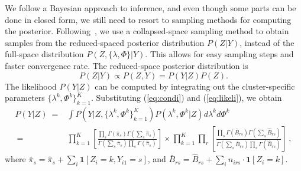 We follow a Bayesian approach to inference, and even though some parts can be done in closed form, we still need to resort to sampling methods for computing the posterior.  Following~\cite{moises}, we use a collapsed-space sampling method \cite{neal2000markov,collapsed_escobar} to obtain samples from the reduced-spaced posterior distribution $P(Z|Y)$, instead of the full-space distribution $P(Z, \{\lambda, \Phi\} | Y)$. This allows for easy sampling steps and faster convergence rate. 
The reduced-space posterior distribution is
\begin{equation*}
 P(Z|Y) \propto P(Z, Y) = P(Y|Z) P(Z).
\end{equation*}
The likelihood $P(Y|Z)$ can be computed by integrating out the cluster-specific parameters $\{\lambda^k, \Phi^k\}_{k=1}^K$.
Substituting  (\ref{eq:condi}) and (\ref{eq:likeli}), we obtain
\begin{equation*}
\renewcommand*{\arraystretch}{1.9}
\begin{array}{rl}
     P(Y|Z) 
~ = & \int  P(Y| Z, \{\lambda^k, \Phi^k \}_{k=1}^K) P(\lambda^k, \Phi^k | Z) d\lambda^k d\Phi^{k} \\
~ = & \displaystyle{ \prod_{k=1}^K 
      \left[ 
      \frac{\prod_s \Gamma(\bar \pi_s) \Gamma (\sum_s \hat \pi_s)}
           {\Gamma\left( \sum_s \bar \pi_s \right) \prod_s \Gamma (\hat \pi_s)}
      \right]  } \times
    \displaystyle{ \prod_{k=1}^K \prod_r 
      \left[ 
      \frac{\prod_s \Gamma(\bar B_{rs}) \Gamma (\sum_s \hat B_{rs})}
           {\Gamma\left( \sum_s \bar  B_{rs} \right) \prod_s \Gamma (\hat B_{rs})}
      \right] } ~,
\end{array}
\end{equation*}
where
$\bar \pi _s = \hat \pi_s + \sum_{i} \mathbf{1}[Z_i=k,Y_{i1} = s]$, and
$\bar B_{rs} = \hat B_{rs} + \sum_{i} n_{irs}  \cdot \mathbf{1}[Z_i=k]$.

